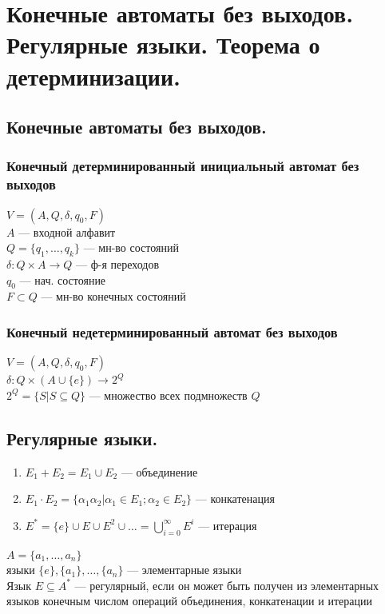 \documentclass[12pt]{article}
\begin{document}
\section{Конечные автоматы без выходов. Регулярные языки. Теорема о детерминизации.}
\subsection{Конечные автоматы без выходов.}
\subsubsection{Конечный детерминированный инициальный автомат без выходов}
	$V = (A, Q, \delta, q_0, F)$\\
	$A$ — входной алфавит\\
	$Q = \{q_1, \dotsc, q_k\}$ — мн-во состояний\\
	$\delta: Q \times A \to Q$ — ф-я переходов\\
	$q_0$ — нач. состояние\\
	$F \subset Q$ — мн-во конечных состояний
\subsubsection{Конечный недетерминированный автомат без выходов}
	$V = (A, Q, \delta, q_0, F)$\\
	$\delta: Q \times (A \cup \{e\}) \to 2^Q$\\
	$2^Q = \{S | S \subseteq Q\}$ — множество всех подмножеств $Q$
\subsection{Регулярные языки.}
	\begin{enumerate}
		\item $E_1 + E_2 = E_1 \cup E_2$ — объединение
		\item $E_1 \cdot E_2 = \{\alpha_1\alpha_2 | \alpha_1 \in E_1; \alpha_2 \in E_2\}$ — конкатенация
		\item $E^* = \{e\} \cup E \cup E^2 \cup \dotsc = \displaystyle\bigcup_{i=0}^\infty E^i$ — итерация
	\end{enumerate}
	$A = \{a_1, \dotsc, a_n\}$\\
	языки $\{e\}, \{a_1\}, \dotsc, \{a_n\}$ — элементарные языки\\

	Язык $E \subseteq A^*$ — регулярный, если он может быть получен из элементарных языков конечным числом операций объединения, конкатенации и итерации\\
\end{document}
